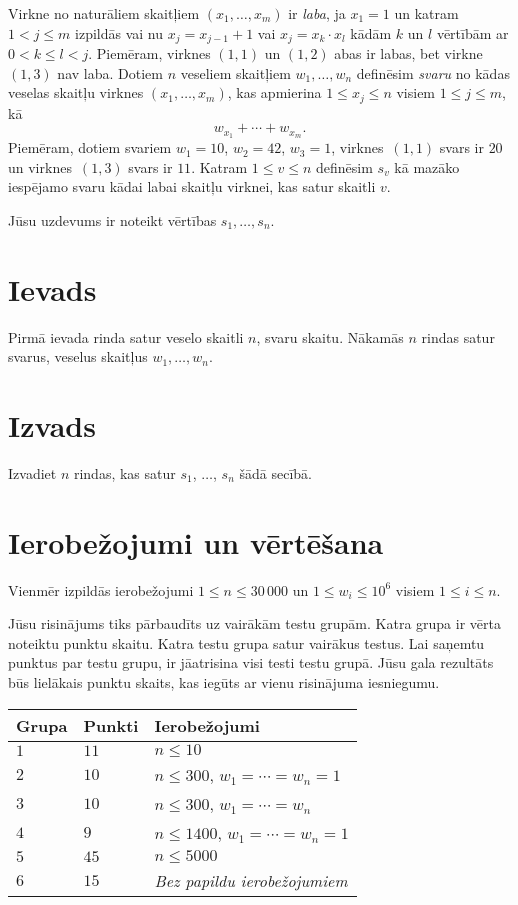 
\noindent
Virkne no naturāliem skaitļiem $(x_1, \ldots, x_m)$ ir \emph{laba}, ja $x_1 = 1$ un katram $1 < j \leq m$ izpildās vai nu $x_j = x_{j-1}+1$ vai $x_j = x_k \cdot x_l$ kādām $k$ un $l$ vērtībām ar $0 < k \leq l < j$. 
Piemēram, virknes $(1,1)$ un $(1,2)$ abas ir labas, bet virkne $(1,3)$ nav laba.
Dotiem $n$ veseliem skaitļiem $w_1, \ldots, w_n$ definēsim \emph{svaru} no kādas veselas skaitļu virknes $(x_1, \ldots, x_m)$, kas apmierina $1 \leq x_j \leq n$ visiem $1 \leq j \leq m$, kā
\[ w_{x_1} + \cdots + w_{x_m}. \]
Piemēram, dotiem svariem $w_1 = 10$, $w_2 = 42$, $w_3 = 1$, virknes~$(1,1)$ svars ir $20$ un virknes~$(1,3)$ svars ir $11$. 
Katram $1\leq v\leq n$ definēsim $s_v$ kā mazāko iespējamo svaru kādai labai skaitļu virknei, kas satur skaitli $v$.

Jūsu uzdevums ir noteikt vērtības $s_1,\ldots ,s_n$.

\section*{Ievads}

Pirmā ievada rinda satur veselo skaitli $n$, svaru skaitu.
Nākamās $n$ rindas satur svarus, veselus skaitļus $w_1, \ldots, w_n$.

\section*{Izvads}

Izvadiet $n$ rindas, kas satur $s_1$, $\ldots$, $s_n$ šādā secībā.

\section*{Ierobežojumi un vērtēšana}

Vienmēr izpildās ierobežojumi
$1\leq n \leq 30\,000$ %
un
$1\leq w_i \leq 10^6$ visiem $1\leq i \leq n$.%

Jūsu risinājums tiks pārbaudīts uz vairākām testu grupām. Katra grupa ir vērta noteiktu punktu skaitu.
Katra testu grupa satur vairākus testus.
Lai saņemtu punktus par testu grupu, ir jāatrisina visi testi testu grupā.
Jūsu gala rezultāts būs lielākais punktu skaits, kas iegūts ar vienu risinājuma iesniegumu.

\medskip
\begin{tabular}{lll}
Grupa & Punkti & Ierobežojumi \\\hline
$1$   & $11$ & $n\leq 10$ \\
$2$   & $10$ & $n\leq 300$, $w_1=\cdots=w_n = 1$ \\
$3$   & $10$ & $n\leq 300$, $w_1=\cdots=w_n$ \\ %
$4$   & $9$ & $n\leq 1400$, $w_1=\cdots=w_n = 1$ \\
$5$   & $45$ & $n\leq 5000$\\
$6$   & $15$ & \emph{Bez papildu ierobežojumiem}
\end{tabular}
